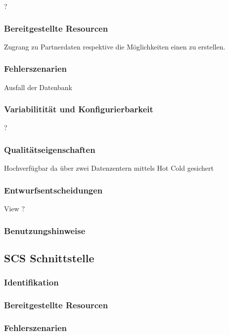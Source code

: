 ?

\subsubsection{Bereitgestellte Resourcen}

Zugrang zu Partnerdaten respektive die Möglichkeiten einen zu erstellen.

\subsubsection{Fehlerszenarien}

Ausfall der Datenbank
	
\subsubsection{Variabilitität und Konfigurierbarkeit}

?

\subsubsection{Qualitätseigenschaften}

Hochverfügbar da über zwei Datenzentern mittels Hot Cold gesichert
	
\subsubsection{Entwurfsentscheidungen} 

View ?

\subsubsection{Benutzungshinweise} 

	
\subsection{SCS Schnittstelle}

\subsubsection{Identifikation}

\subsubsection{Bereitgestellte Resourcen}

\subsubsection{Fehlerszenarien}

